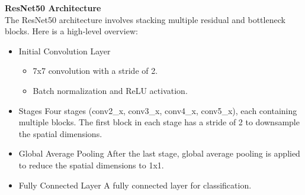\noindent\textbf{ResNet50 Architecture}\\
The ResNet50 architecture involves stacking multiple residual and bottleneck blocks. Here is a high-level overview:
\begin{itemize}
   \item{Initial Convolution Layer}
\begin{itemize}
  \item 7x7 convolution with a stride of 2.
  \item Batch normalization and ReLU activation.
\end{itemize}

\item{Stages}
Four stages (conv2\_x, conv3\_x, conv4\_x, conv5\_x), each containing multiple blocks. The first block in each stage has a stride of 2 to downsample the spatial dimensions.

\item{Global Average Pooling}
After the last stage, global average pooling is applied to reduce the spatial dimensions to 1x1.

\item{Fully Connected Layer}
A fully connected layer for classification.
\end{itemize}
